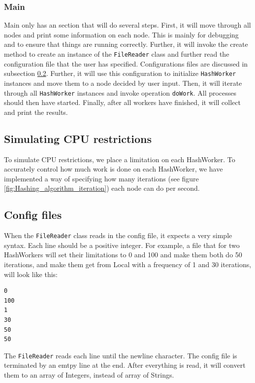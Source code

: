 \subsubsection{Main}
Main only has an \verbinitially section that will do several steps. First, it will move through all nodes and print some information on each node. This is mainly for debugging and to ensure that things are running correctly. Further, it will invoke the create method to create an instance of the \verb|FileReader| class and further read the configuration file that the user has specified. Configurations files are discussed in subsection \ref{subsection:configfiles}. Further, it will use this configuration to initialize \verb|HashWorker| instances and move them to a node decided by user input. Then, it will iterate through all \verb|HashWorker| instances and invoke operation \verb|doWork|. All processes should then have started. Finally, after all workers have finished, it will collect and print the results.



\subsection{Simulating CPU restrictions}
To simulate CPU restrictions, we place a limitation on each HashWorker. To accurately control how much work is done on each HashWorker, we have implemented a way of specifying how many iterations (see figure \ref{fig:Hashing_algorithm_iteration}) each node can do per second.



\subsection{Config files}\label{subsection:configfiles}
When the \verb|FileReader| class reads in the config file, it expects a very simple syntax. Each line should be a positive integer. For example, a file that for two HashWorkers will set their limitations to 0 and 100 and make them both do 50 iterations, and make them get from Local with a frequency of 1 and 30 iterations, will look like this:
\begin{lstlisting}
0
100
1
30
50
50

\end{lstlisting}
The \verb|FileReader| reads each line until the newline character. The config file is terminated by an emtpy line at the end. After everything is read, it will convert them to an array of Integers, instead of array of Strings.

